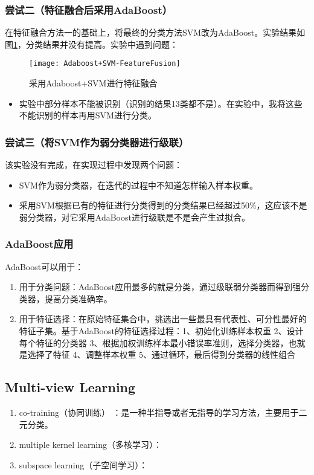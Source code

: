 \subsubsection{尝试二（特征融合后采用AdaBoost）}
在特征融合方法一的基础上，将最终的分类方法SVM改为AdaBoost。实验结果如图\ref{fig:Adaboost+SVM-FeatureFusion}，分类结果并没有提高。实验中遇到问题：
\begin{figure}[!ht]
\centering
\texttt{[image: Adaboost+SVM-FeatureFusion]}
\caption{采用Adaboost+SVM进行特征融合}
\label{fig:Adaboost+SVM-FeatureFusion}
\end{figure}
\begin{itemize}
\item 实验中部分样本不能被识别（识别的结果13类都不是）。在实验中，我将这些不能识别的样本再用SVM进行分类。
\end{itemize}

\subsubsection{尝试三（将SVM作为弱分类器进行级联）}
该实验没有完成，在实现过程中发现两个问题：
\begin{itemize}
\item SVM作为弱分类器，在迭代的过程中不知道怎样输入样本权重。
\item 采用SVM根据已有的特征进行分类得到的分类结果已经超过50\%，这应该不是弱分类器，对它采用AdaBoost进行级联是不是会产生过拟合。
\end{itemize}

\subsubsection{AdaBoost应用}
AdaBoost可以用于：
\begin{enumerate}
\item 用于分类问题：AdaBoost应用最多的就是分类，通过级联弱分类器而得到强分类器，提高分类准确率。
\item 用于特征选择：在原始特征集合中，挑选出一些最具有代表性、可分性最好的特征子集。基于AdaBoost的特征选择过程：1、初始化训练样本权重 2、设计每个特征的分类器 3、根据加权训练样本最小错误率准则，选择分类器，也就是选择了特征 4、调整样本权重 5、通过循环，最后得到分类器的线性组合
\end{enumerate}



\subsection{Multi-view Learning}
\begin{enumerate}
\item co-training（协同训练） ：是一种半指导或者无指导的学习方法，主要用于二元分类。
\item multiple kernel learning（多核学习）：
\item subspace learning（子空间学习）：
\end{enumerate}


